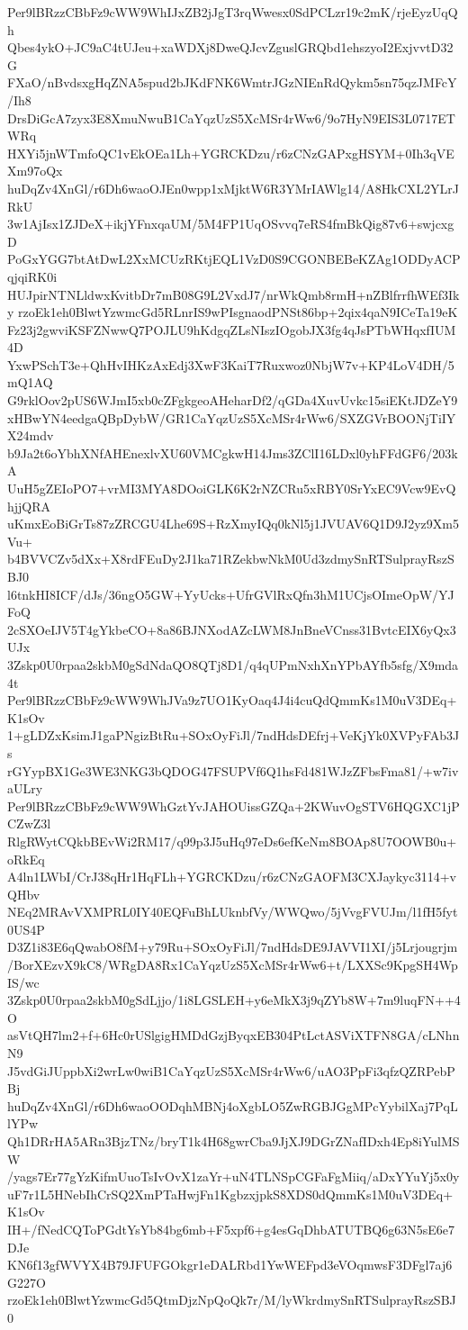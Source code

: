Per9lBRzzCBbFz9cWW9WhIJxZB2jJgT3rqWwesx0SdPCLzr19c2mK/rjeEyzUqQh
Qbes4ykO+JC9aC4tUJeu+xaWDXj8DweQJcvZguslGRQbd1ehszyoI2ExjvvtD32G
FXaO/nBvdsxgHqZNA5spud2bJKdFNK6WmtrJGzNIEnRdQykm5sn75qzJMFcY/Ih8
DrsDiGcA7zyx3E8XmuNwuB1CaYqzUzS5XcMSr4rWw6/9o7HyN9EIS3L0717ETWRq
HXYi5jnWTmfoQC1vEkOEa1Lh+YGRCKDzu/r6zCNzGAPxgHSYM+0Ih3qVEXm97oQx
huDqZv4XnGl/r6Dh6waoOJEn0wpp1xMjktW6R3YMrIAWlg14/A8HkCXL2YLrJRkU
3w1AjIsx1ZJDeX+ikjYFnxqaUM/5M4FP1UqOSvvq7eRS4fmBkQig87v6+swjcxgD
PoGxYGG7btAtDwL2XxMCUzRKtjEQL1VzD0S9CGONBEBeKZAg1ODDyACPqjqiRK0i
HUJpirNTNLldwxKvitbDr7mB08G9L2VxdJ7/nrWkQmb8rmH+nZBlfrrfhWEf3Iky
rzoEk1eh0BlwtYzwmcGd5RLnrIS9wPIsgnaodPNSt86bp+2qix4qaN9ICeTa19eK
Fz23j2gwviKSFZNwwQ7POJLU9hKdgqZLsNIszIOgobJX3fg4qJsPTbWHqxfIUM4D
YxwPSchT3e+QhHvIHKzAxEdj3XwF3KaiT7Ruxwoz0NbjW7v+KP4LoV4DH/5mQ1AQ
G9rklOov2pUS6WJmI5xb0cZFgkgeoAHeharDf2/qGDa4XuvUvkc15siEKtJDZeY9
xHBwYN4eedgaQBpDybW/GR1CaYqzUzS5XcMSr4rWw6/SXZGVrBOONjTiIYX24mdv
b9Ja2t6oYbhXNfAHEnexlvXU60VMCgkwH14Jms3ZClI16LDxl0yhFFdGF6/203kA
UuH5gZEIoPO7+vrMI3MYA8DOoiGLK6K2rNZCRu5xRBY0SrYxEC9Vcw9EvQhjjQRA
uKmxEoBiGrTs87zZRCGU4Lhe69S+RzXmyIQq0kNl5j1JVUAV6Q1D9J2yz9Xm5Vu+
b4BVVCZv5dXx+X8rdFEuDy2J1ka71RZekbwNkM0Ud3zdmySnRTSulprayRszSBJ0
l6tnkHI8ICF/dJs/36ngO5GW+YyUcks+UfrGVlRxQfn3hM1UCjsOImeOpW/YJFoQ
2cSXOeIJV5T4gYkbeCO+8a86BJNXodAZcLWM8JnBneVCnss31BvtcEIX6yQx3UJx
3Zskp0U0rpaa2skbM0gSdNdaQO8QTj8D1/q4qUPmNxhXnYPbAYfb5sfg/X9mda4t
Per9lBRzzCBbFz9cWW9WhJVa9z7UO1KyOaq4J4i4cuQdQmmKs1M0uV3DEq+K1sOv
1+gLDZxKsimJ1gaPNgizBtRu+SOxOyFiJl/7ndHdsDEfrj+VeKjYk0XVPyFAb3Js
rGYypBX1Ge3WE3NKG3bQDOG47FSUPVf6Q1hsFd481WJzZFbsFma81/+w7ivaULry
Per9lBRzzCBbFz9cWW9WhGztYvJAHOUissGZQa+2KWuvOgSTV6HQGXC1jPCZwZ3l
RlgRWytCQkbBEvWi2RM17/q99p3J5uHq97eDs6efKeNm8BOAp8U7OOWB0u+oRkEq
A4ln1LWbI/CrJ38qHr1HqFLh+YGRCKDzu/r6zCNzGAOFM3CXJaykyc3114+vQHbv
NEq2MRAvVXMPRL0IY40EQFuBhLUknbfVy/WWQwo/5jVvgFVUJm/l1fH5fyt0US4P
D3Z1i83E6qQwabO8fM+y79Ru+SOxOyFiJl/7ndHdsDE9JAVVI1XI/j5Lrjougrjm
/BorXEzvX9kC8/WRgDA8Rx1CaYqzUzS5XcMSr4rWw6+t/LXXSc9KpgSH4WpIS/wc
3Zskp0U0rpaa2skbM0gSdLjjo/1i8LGSLEH+y6eMkX3j9qZYb8W+7m9luqFN++4O
asVtQH7lm2+f+6Hc0rUSlgigHMDdGzjByqxEB304PtLctASViXTFN8GA/cLNhnN9
J5vdGiJUppbXi2wrLw0wiB1CaYqzUzS5XcMSr4rWw6/uAO3PpFi3qfzQZRPebPBj
huDqZv4XnGl/r6Dh6waoOODqhMBNj4oXgbLO5ZwRGBJGgMPcYybilXaj7PqLlYPw
Qh1DRrHA5ARn3BjzTNz/bryT1k4H68gwrCba9JjXJ9DGrZNafIDxh4Ep8iYulMSW
/yags7Er77gYzKifmUuoTsIvOvX1zaYr+uN4TLNSpCGFaFgMiiq/aDxYYuYj5x0y
uF7r1L5HNebIhCrSQ2XmPTaHwjFn1KgbzxjpkS8XDS0dQmmKs1M0uV3DEq+K1sOv
IH+/fNedCQToPGdtYsYb84bg6mb+F5xpf6+g4esGqDhbATUTBQ6g63N5sE6e7DJe
KN6f13gfWVYX4B79JFUFGOkgr1eDALRbd1YwWEFpd3eVOqmwsF3DFgl7aj6G227O
rzoEk1eh0BlwtYzwmcGd5QtmDjzNpQoQk7r/M/lyWkrdmySnRTSulprayRszSBJ0

